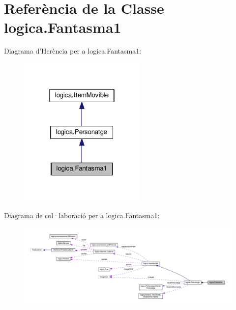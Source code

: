 \hypertarget{classlogica_1_1_fantasma1}{\section{Referència de la Classe logica.\+Fantasma1}
\label{classlogica_1_1_fantasma1}
}


Diagrama d'Herència per a logica.\+Fantasma1\+:\nopagebreak
\begin{figure}[H]
\begin{center}
\leavevmode
\includegraphics[width=178pt]{classlogica_1_1_fantasma1__inherit__graph}
\end{center}
\end{figure}


Diagrama de col·laboració per a logica.\+Fantasma1\+:\nopagebreak
\begin{figure}[H]
\begin{center}
\leavevmode
\includegraphics[width=350pt]{classlogica_1_1_fantasma1__coll__graph}
\end{center}
\end{figure}
